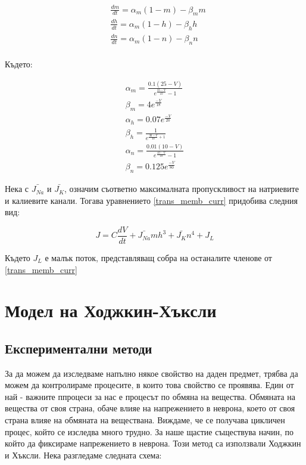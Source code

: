 \documentclass{article}
\numberwithin{equation}{section}
\begin{document}
\begin{equation}\label{chanels}
    \begin{aligned}
        &\frac{dm}{dt} = \alpha_m(1-m) - \beta_mm\\
        &\frac{dh}{dt} = \alpha_m(1-h) - \beta_hh\\
        &\frac{dn}{dt} = \alpha_m(1-n) - \beta_nn\\
    \end{aligned}
\end{equation}

Където:

    \begin{gather*}
        \alpha_m = \frac{0.1\left(25 - V\right)}{e^{\frac{25-V}{10}} - 1}\\
        \beta_m = 4e^{\frac{-V}{18}}\\
        \alpha_h = 0.07e^{\frac{-V}{20}}\\
        \beta_h = \frac{1}{e^{\frac{30-V}{10} + 1}}\\
        \alpha_n = \frac{0.01\left(10 - V\right)}{e^{\frac{10-V}{10}} - 1}\\
        \beta_n = 0.125e^{\frac{-V}{80}}
    \end{gather*}

Нека с $\bar{J_{Na}}$ и $\bar{J_{K}}$, означим съответно максималната пропускливост на натриевите и калиевите канали. Тогава
уравнението \eqref{trans_memb_curr} придобива следния вид:

\begin{equation}\label{trans_memb_curr_h-h}
    J = C\frac{dV}{dt} +\bar{J_{Na}}mh^3 + \bar{J_{K}}n^4 + J_{L}
\end{equation}

Където $J_{L}$ е малък поток, представляващ собра на останалите членове от \eqref{trans_memb_curr}

\section{Модел на Ходжкин-Хъксли}
    \subsection[Експериментални методи]{Експериментални методи}
        За да можем да изследваме напълно някое свойство на даден предмет, трябва да можем да контролираме процесите, в които това
        свойство се проявява.  Един от най - важните ппроцеси за нас е процесът по обмяна на вещества.  Обмяната на вещества от своя страна,
        обаче влияе на напрежението в неврона, което от своя страна влияе на обмяната на веществана. Виждаме, че се получава цикличен
        процес, който се изследва много трудно. За наше щастие съществува начин, по който да фиксираме напрежението в неврона. Този метод са
        използвали Ходжкин и Хъксли. Нека разгледаме следната схема:
\end{document}

